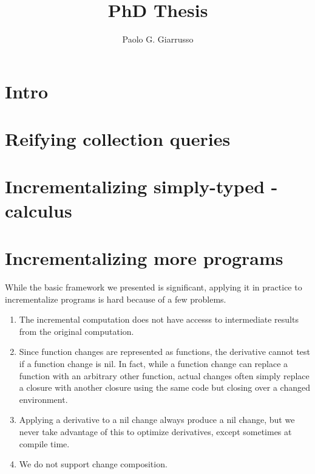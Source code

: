 \documentclass{book}
\title{PhD Thesis}
\author{Paolo G. Giarrusso}
\begin{document}
\maketitle
\chapter{Intro}
\chapter{Reifying collection queries}





\newcommand{\co}[1]{\code{#1}} %
\chapter{Incrementalizing simply-typed \TitleLambda{}-calculus}
















\begin{oldSec}

\end{oldSec}

\begin{oldSec}

\end{oldSec}

\chapter{Incrementalizing more programs}

While the basic framework we presented is significant, applying it in practice
to incrementalize programs is hard because of a few problems.
\begin{enumerate}
\item The incremental computation does not have accesss to intermediate results from the original computation.
\item Since function changes are represented as functions, the derivative cannot
  test if a function change is nil. In fact, while a function change can replace
  a function with an arbitrary other function, actual changes often simply
  replace a closure with another closure using the same code but closing over a
  changed environment.
\item Applying a derivative to a nil change always produce a nil change, but we
  never take advantage of this to optimize derivatives, except sometimes at
  compile time.
\item We do not support change composition.
\end{enumerate}



\end{document}
